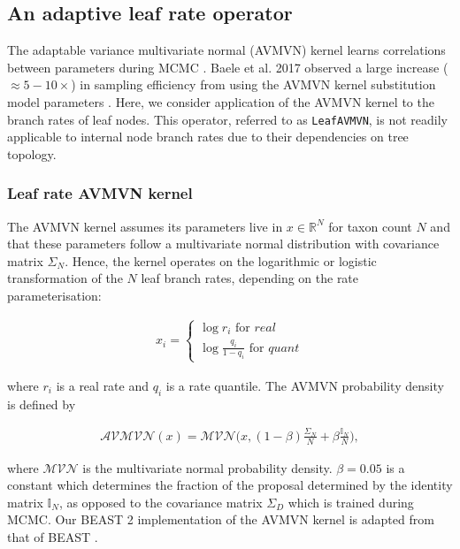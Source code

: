 \documentclass[10pt,letterpaper]{article}
\begin{document}
\clearpage
\subsection*{An adaptive leaf rate operator}
\label{AVMVN_sect}

The adaptable variance multivariate normal (AVMVN) kernel  learns correlations between parameters during MCMC \cite{baele2017adaptive,suchard2018bayesian}. 
Baele et al. 2017  observed a large increase ($\approx 5-10 \times$) in sampling efficiency from using the AVMVN kernel substitution model parameters \cite{baele2017adaptive}.  
Here, we consider application of the AVMVN kernel to the branch rates of leaf nodes. 
This operator, referred to as \texttt{LeafAVMVN}, is not readily applicable to internal node branch rates due to their dependencies on tree topology.  




\subsubsection*{Leaf rate AVMVN kernel}


The AVMVN kernel assumes its parameters live in $x \in \mathbb{R}^N$ for taxon count $N$ and that these parameters follow a multivariate normal distribution with covariance matrix $\Sigma_N$. Hence, the kernel operates on the logarithmic or logistic transformation of the $N$ leaf branch rates, depending on the rate parameterisation:

\begin{align}
	x_i = \begin{cases} \log r_i \text{ for } \textit{real} \\
						\log \frac{q_i}{1 - q_i} \text{ for } \textit{quant}  \end{cases}
\end{align}

\noindent
where $r_i$ is a real rate and $q_i$ is a rate quantile. The AVMVN probability density is defined by 


\begin{align}
	\mathcal{AVMVN}(x) =  \mathcal{MVN}\big(x, (1-\beta) \frac{\Sigma_N}{N} + \beta \frac{\mathbb{I}_N}{N} \big) ,
\end{align}


\noindent
where $\mathcal{MVN}$ is the multivariate normal probability density. $\beta  = 0.05$ is a constant which determines the fraction of the proposal determined by the identity matrix $\mathbb{I}_N$, as opposed to the covariance matrix $\Sigma_D$ which is trained during MCMC.
Our BEAST 2 implementation of the AVMVN kernel is adapted from that of BEAST \cite{suchard2018bayesian}.
\end{document}
